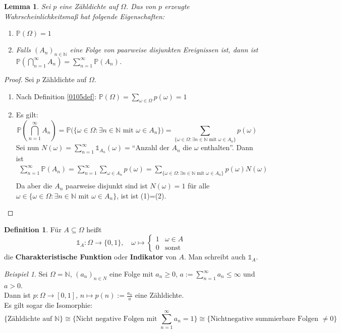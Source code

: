 \documentclass[10pt,a4paper]{article}
\newcommand{\N}{\ensuremath{\mathbb{N}}}
\newcommand{\cha}{\mathds{1}}
\newcommand{\Prb}{\mathbb P}
\theoremstyle{plain}
\newtheorem{lem}[theorem]{Lemma}
\theoremstyle{definition}
\newtheorem{definition}[theorem]{Definition}
\theoremstyle{remark}
\newtheorem{exm}[theorem]{Beispiel}
\begin{document}
	\begin{lem}
		Sei $p$ eine Zähldichte auf $\Omega$. Das von $p$ erzeugte Wahrscheinlichkeitsmaß hat folgende Eigenschaften:
		\begin{enumerate}
			\item $\Prb(\Omega)=1$
			\item Falls $(A_n)_{n\in\N}$ eine Folge von paarweise disjunkten Ereignissen ist, dann ist $\Prb(\bigcap_{n=1}^\infty A_n)=\sum_{n=1}^{\infty}\Prb(A_n)$.
		\end{enumerate}
	\end{lem}
	\begin{proof}
		Sei $p$ Zähldichte auf $\Omega$.
		\begin{enumerate}
			\item Nach Definition \ref{0105def}: $\Prb(\Omega)=\sum_{\omega\in\Omega}p(\omega)=1$
			\item Es gilt:
			\[\tag{1}
			\Prb\left(\bigcap_{n=1}^\infty A_n\right)=\Prb\big(\{\omega\in\Omega:\text{$\exists n\in\N$ mit $\omega\in A_n$}\}\big)
			=\sum_{\{\omega\in\Omega:\text{$\exists n\in\N$ mit $\omega\in A_n$}\}} p(\omega)
			\]
			Sei nun $N(\omega)=\sum_{n=1}^{\infty}\cha_{A_n}(\omega)=$\enquote{Anzahl der $A_n$ die  $\omega$ enthalten}. Dann ist 
			\begin{align*}
			\sum_{n=1}^\infty\Prb(A_n)=\sum_{n=1}^\infty\sum_{\omega\in A_n}	\tag{2} p(\omega)=\sum_{\{\omega\in\Omega:\text{$\exists n\in\N$ mit $\omega\in A_n$}\}}p(\omega)N(\omega)\\
			\end{align*}
			Da aber die $A_n$ paarweise disjunkt sind ist $N(\omega)=1$ für alle $\omega\in{\{\omega\in\Omega:\text{$\exists n\in\N$ mit $\omega\in A_n$}\}}$, ist ist (1)=(2).\qedhere
		\end{enumerate}
	\end{proof}

	\begin{definition}
		Für $A\subseteq\Omega$ heißt 
		\[\cha_A:\Omega\to\{0,1\},\quad \omega\mapsto\begin{cases}
		1&\omega\in A\\0&\text{sonst}
		\end{cases}\]
		die \textbf{Charakteristische Funktion} oder \textbf{Indikator} von $A$. Man schreibt auch $\mathds{1}_A$.
	\end{definition}
	
	\begin{exm}
		Sei $\Omega=\N$, $(a_n)_{n\in N}$ eine Folge mit $a_n\ge 0$, $a:=\sum_{n=1}^\infty a_n\le \infty$ und $a>0$.\\
		Dann ist $p:\Omega\to[0,1]$, $n\mapsto p(n):=\frac{a_n}{a}$ eine Zähldichte.\\
		Es gilt sogar die Isomorphie: 
		\[\{\text{Zähldichte auf $\N$}\}\cong \{\text{Nicht negative Folgen mit $\sum_{n=1}^{\infty}a_n=1$}\}\cong\{\text{Nichtnegative summierbare Folgen $\neq 0$}\}\]
	\end{exm}
	
\end{document}
